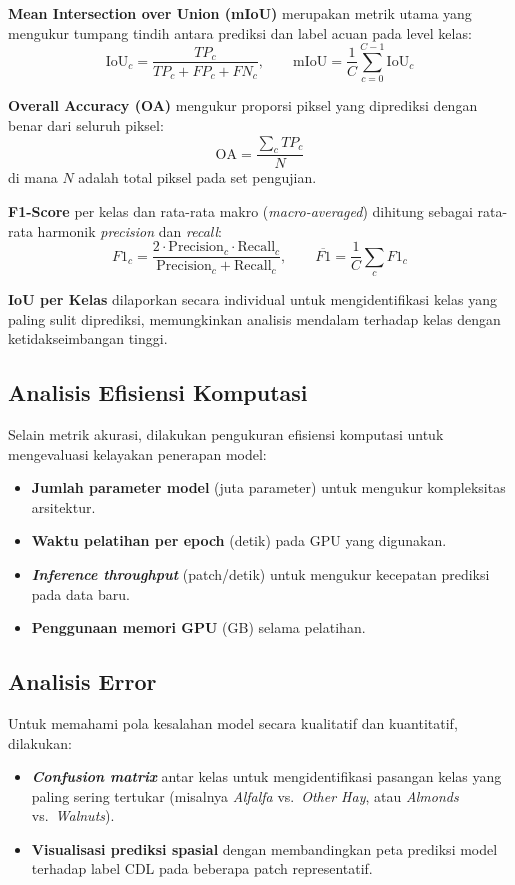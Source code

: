 \textbf{Mean Intersection over Union (mIoU)} merupakan metrik utama yang mengukur tumpang tindih antara prediksi dan label acuan pada level kelas:
\begin{equation}
    \text{IoU}_c = \frac{TP_c}{TP_c + FP_c + FN_c}, \qquad
    \text{mIoU} = \frac{1}{C} \sum_{c=0}^{C-1} \text{IoU}_c
\end{equation}

\textbf{Overall Accuracy (OA)} mengukur proporsi piksel yang diprediksi dengan benar dari seluruh piksel:
\begin{equation}
    \text{OA} = \frac{\sum_{c} TP_c}{N}
\end{equation}
di mana $N$ adalah total piksel pada set pengujian.

\textbf{F1-Score} per kelas dan rata-rata makro (\textit{macro-averaged}) dihitung sebagai rata-rata harmonik \textit{precision} dan \textit{recall}:
\begin{equation}
    F1_c = \frac{2 \cdot \text{Precision}_c \cdot \text{Recall}_c}{\text{Precision}_c + \text{Recall}_c}, \qquad
    \overline{F1} = \frac{1}{C} \sum_{c} F1_c
\end{equation}

\textbf{IoU per Kelas} dilaporkan secara individual untuk mengidentifikasi kelas yang paling sulit diprediksi, memungkinkan analisis mendalam terhadap kelas dengan ketidakseimbangan tinggi.

\subsection{Analisis Efisiensi Komputasi}

Selain metrik akurasi, dilakukan pengukuran efisiensi komputasi untuk mengevaluasi kelayakan penerapan model:
\begin{itemize}
    \item \textbf{Jumlah parameter model} (juta parameter) untuk mengukur kompleksitas arsitektur.
    \item \textbf{Waktu pelatihan per epoch} (detik) pada GPU yang digunakan.
    \item \textbf{\textit{Inference throughput}} (patch/detik) untuk mengukur kecepatan prediksi pada data baru.
    \item \textbf{Penggunaan memori GPU} (GB) selama pelatihan.
\end{itemize}

\subsection{Analisis Error}

Untuk memahami pola kesalahan model secara kualitatif dan kuantitatif, dilakukan:
\begin{itemize}
    \item \textbf{\textit{Confusion matrix}} antar kelas untuk mengidentifikasi pasangan kelas yang paling sering tertukar (misalnya \textit{Alfalfa} vs.\ \textit{Other Hay}, atau \textit{Almonds} vs.\ \textit{Walnuts}).
    \item \textbf{Visualisasi prediksi spasial} dengan membandingkan peta prediksi model terhadap label CDL pada beberapa patch representatif.
\end{itemize}
